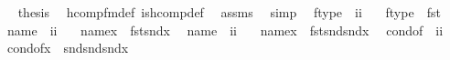 \begin{isabellebody}
\ \ \isamarkupfalse%
\ {\isacharquery}{\kern0pt}thesis\ \isamarkupfalse%
\ hcomp{\isacharunderscore}{\kern0pt}fm{\isacharunderscore}{\kern0pt}def\ is{\isacharunderscore}{\kern0pt}hcomp{\isacharunderscore}{\kern0pt}def\ \isamarkupfalse%
\ assms\ \isamarkupfalse%
\ simp\isanewline
{}\isamarkupfalse%
%
\endisatagproof
{\isafoldproof}%
%
\isadelimproof
\isanewline
%
\endisadelimproof
\isanewline
\isanewline
\isanewline
{}\isamarkupfalse%
\isanewline
\ \ ftype\ {\isacharcolon}{\kern0pt}{\isacharcolon}{\kern0pt}\ {\isachardoublequoteopen}i{\isasymRightarrow}i{\isachardoublequoteclose}\ \isanewline
\ \ {\isachardoublequoteopen}ftype\ {\isasymequiv}\ fst{\isachardoublequoteclose}\isanewline
\isanewline
{}\isamarkupfalse%
\isanewline
\ \ name{}\ {\isacharcolon}{\kern0pt}{\isacharcolon}{\kern0pt}\ {\isachardoublequoteopen}i{\isasymRightarrow}i{\isachardoublequoteclose}\ \isanewline
\ \ {\isachardoublequoteopen}name{}{\isacharparenleft}{\kern0pt}x{\isacharparenright}{\kern0pt}\ {\isasymequiv}\ fst{\isacharparenleft}{\kern0pt}snd{\isacharparenleft}{\kern0pt}x{\isacharparenright}{\kern0pt}{\isacharparenright}{\kern0pt}{\isachardoublequoteclose}\isanewline
\isanewline
{}\isamarkupfalse%
\isanewline
\ \ name{}\ {\isacharcolon}{\kern0pt}{\isacharcolon}{\kern0pt}\ {\isachardoublequoteopen}i{\isasymRightarrow}i{\isachardoublequoteclose}\ \isanewline
\ \ {\isachardoublequoteopen}name{}{\isacharparenleft}{\kern0pt}x{\isacharparenright}{\kern0pt}\ {\isasymequiv}\ fst{\isacharparenleft}{\kern0pt}snd{\isacharparenleft}{\kern0pt}snd{\isacharparenleft}{\kern0pt}x{\isacharparenright}{\kern0pt}{\isacharparenright}{\kern0pt}{\isacharparenright}{\kern0pt}{\isachardoublequoteclose}\isanewline
\isanewline
{}\isamarkupfalse%
\isanewline
\ \ cond{\isacharunderscore}{\kern0pt}of\ {\isacharcolon}{\kern0pt}{\isacharcolon}{\kern0pt}\ {\isachardoublequoteopen}i{\isasymRightarrow}i{\isachardoublequoteclose}\ \isanewline
\ \ {\isachardoublequoteopen}cond{\isacharunderscore}{\kern0pt}of{\isacharparenleft}{\kern0pt}x{\isacharparenright}{\kern0pt}\ {\isasymequiv}\ snd{\isacharparenleft}{\kern0pt}snd{\isacharparenleft}{\kern0pt}snd{\isacharparenleft}{\kern0pt}{\isacharparenleft}{\kern0pt}x{\isacharparenright}{\kern0pt}{\isacharparenright}{\kern0pt}{\isacharparenright}{\kern0pt}{\isacharparenright}{\kern0pt}{\isachardoublequoteclose}\isanewline

\end{isabellebody}
